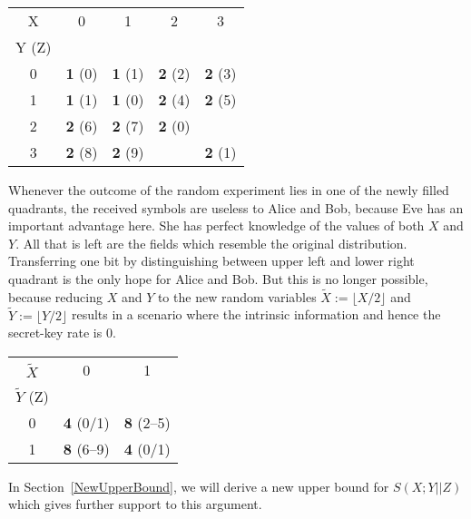 \documentclass[a4paper, twoside, openany]{report}
\newcommand{\srate}{S(X;Y||Z)}
\newcommand{\p}[1]{\textbf{#1}}
\newcommand{\wtil}[1]{\widetilde{#1}}
\newcommand{\floor}[1]{\lfloor #1 \rfloor}
\theoremstyle{plain}
\theoremstyle{definition}
\begin{document}
\begin{center}
\begin{tabular}{|c||c|c|c|c|}
\hline
X     &     0     &     1     &     2     &     3     \\
Y (Z) &           &           &           &           \\
\hline\hline
0     & \p{1} (0) & \p{1} (1) & \p{2} (2) & \p{2} (3) \\
\hline
1     & \p{1} (1) & \p{1} (0) & \p{2} (4) & \p{2} (5) \\
\hline
2     & \p{2} (6) & \p{2} (7) & \p{2} (0) &           \\
\hline
3     & \p{2} (8) & \p{2} (9) &           & \p{2} (1) \\
\hline
\end{tabular}
\end{center}

Whenever the outcome of the random experiment lies in one of the newly filled quadrants, the received symbols are useless to Alice and Bob, because Eve has an important advantage here. She has perfect knowledge of the values of both $X$ and $Y$. All that is left are the fields which resemble the original distribution. Transferring one bit by distinguishing between upper left and lower right quadrant is the only hope for Alice and Bob. But this is no longer possible, because reducing $X$ and $Y$ to the new random variables $\wtil{X} := \floor{X/2}$ and $\wtil{Y} := \floor{Y/2}$ results in a scenario where the intrinsic information and hence the secret-key rate is $0$.


\begin{center}
\begin{tabular}{|c||c|c|}
\hline
$\wtil{X}$     &      0      &      1      \\
$\wtil{Y}$ (Z) &             &             \\
\hline\hline
0              & \p{4} (0/1) & \p{8} (2--5)\\
\hline
1              & \p{8} (6--9)& \p{4} (0/1) \\
\hline
\end{tabular}
\end{center}

In Section~\ref{NewUpperBound}, we will derive a new upper bound for $\srate$ which gives further support to this argument.

\end{document}
